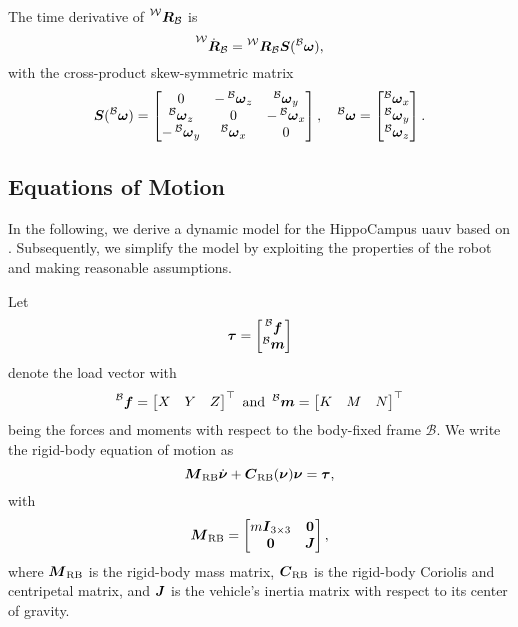 The time derivative of $\Rbodyworld$ is
\begin{equation}
	\label{eq:rotation-matrix-derivative}
	\prescript{\mathcal{W}}{}{\dot{\bm{R}}_{\mathcal{B}}} = \Rbodyworld \Sb(\vangbody)
	,
\end{equation}
with the cross-product skew-symmetric matrix
\begin{equation}
	\Sb(\vangbody) = 
	\begin{bmatrix}
		0 & -\vangbodyz & \vangbodyy \\
		\vangbodyz & 0 & -\vangbodyx \\
		-\vangbodyy & \vangbodyx & 0
	\end{bmatrix},
	\quad
	\vangbody = 
	\begin{bmatrix}
		\vangbodyx \\
		\vangbodyy \\ 
		\vangbodyz
	\end{bmatrix}
	.
\end{equation}



\subsection{Equations of Motion}


In the following, we derive a dynamic model for the HippoCampus \ac{uauv} based on \cite{Fossen11}.
Subsequently, we simplify the model by exploiting the properties of the robot and making reasonable assumptions.

Let
\begin{equation}
	\mbox{$\bm{\tau}$} = 
	\begin{bmatrix}
		\prescript{\mathcal{B}}{}{\mbox{$\bm{f}$}} \\
		\prescript{\mathcal{B}}{}{\mbox{$\bm{m}$}}
	\end{bmatrix}
\end{equation}
denote the load vector with 
\begin{equation}
	\prescript{\mathcal{B}}{}{\mbox{$\bm{f}$}} = 
	\begin{bmatrix}
		X & Y & Z
	\end{bmatrix}^\top
	\text{ and }
	\prescript{\mathcal{B}}{}{\mbox{$\bm{m}$}} = 
	\begin{bmatrix}
		K & M & N
	\end{bmatrix}^\top
\end{equation}
being the forces and moments with respect to the body-fixed frame $\mathcal{B}$.
We write the rigid-body equation of motion as
\begin{equation}
	\label{eq:rigid-body-equation-of-motion}
	\mbox{$\bm{M}$}_\text{RB} \mbox{$\dot{\bm{\nu}}$}
	+ \mbox{$\bm{C}$}_\text{RB}(\mbox{$\bm{\nu}$}) \mbox{$\bm{\nu}$}
	= \mbox{$\bm{\tau}$}
	,
\end{equation}
with
\begin{equation}
	\label{eq:rigid-body-mass-matrix}
	\mbox{$\bm{M}$}_\text{RB} =
	\begin{bmatrix}
		m \mbox{$\bm{I}$}_{3 \times 3} & \bm{0} \\
		\bm{0} & \mbox{$\bm{J}$}
	\end{bmatrix}
	,
\end{equation}
where $\mbox{$\bm{M}$}_\text{RB}$ is the rigid-body mass matrix, $\mbox{$\bm{C}$}_\text{RB}$ is the rigid-body Coriolis and centripetal matrix, and $\mbox{$\bm{J}$}$ is the vehicle's inertia matrix with respect to its center of gravity.

